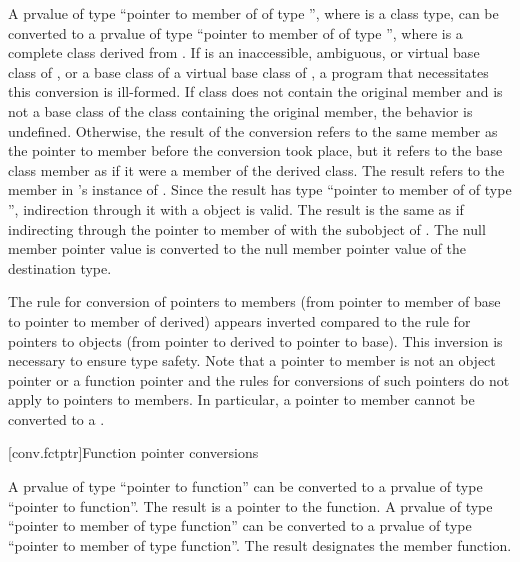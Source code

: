 \pnum
A prvalue of type ``pointer to member of  of type \cv{}
'', where  is a class type, can be converted to
a prvalue of type ``pointer to member of  of type \cv{}
'', where  is a complete class derived
from . If  is an
inaccessible,
ambiguous, or virtual base
class of , or a base class of a virtual base class of
, a program that necessitates this conversion is ill-formed.
If class  does not contain the original member and
is not a base class of the class containing the original member,
the behavior is undefined. Otherwise,
the result of the conversion refers to the same member as the pointer to
member before the conversion took place, but it refers to the base class
member as if it were a member of the derived class. The result refers to
the member in 's instance of . Since the result has
type ``pointer to member of  of type \cv{} '',
indirection through it with a  object is valid. The result is the same
as if indirecting through the pointer to member of  with the
 subobject of . The null member pointer value is
converted to the null member pointer value of the destination
type.
\begin{footnote}
The rule for conversion of pointers to members (from pointer to member
of base to pointer to member of derived) appears inverted compared to
the rule for pointers to objects (from pointer to derived to pointer to
base). This inversion is
necessary to ensure type safety. Note that a pointer to member is not
an object pointer or a function pointer
and the rules for conversions
of such pointers do not apply to pointers to members.
%
In particular, a pointer to member cannot be converted to a
.
\end{footnote}

[conv.fctptr]{Function pointer conversions}

\pnum
{}%
A prvalue of type ``pointer to  function''
can be converted to a prvalue of type ``pointer to function''.
The result is a pointer to the function.
A prvalue of type ``pointer to member of type  function''
can be converted to a prvalue of type ``pointer to member of type function''.
The result designates the member function.

